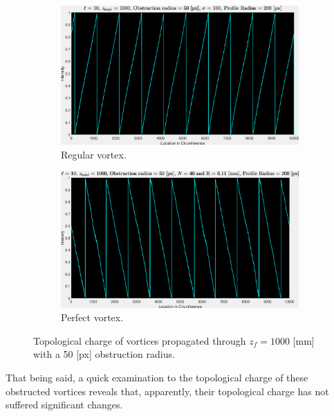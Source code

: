\begin{figure}[htbp]
    \centering
    \begin{subfigure}[b]{0.45\textwidth}
        \centering
        \includegraphics[width=\textwidth]{images/c04/type=0_r=50_zi=0_zf=1000_TC.eps}
        \caption{Regular vortex.}
    \end{subfigure}
    \hfill
    \begin{subfigure}[b]{0.45\textwidth}
        \centering
        \includegraphics[width=\textwidth]{images/c04/type=1_r=50_zi=0_zf=1000_TC.eps}
        \caption{Perfect vortex.}
        \label{subfig:Perfect_r=50_z=1000}
    \end{subfigure}
    \caption{Topological charge of vortices propagated through $z_f = 1000$ [mm] with a 50 [px] obstruction radius.}
    \label{fig:Vortices_r=50_z=1000_TC}
\end{figure}

That being said, a quick examination to the topological charge of these obstructed vortices reveals that, apparently, their topological charge has not suffered significant changes.


